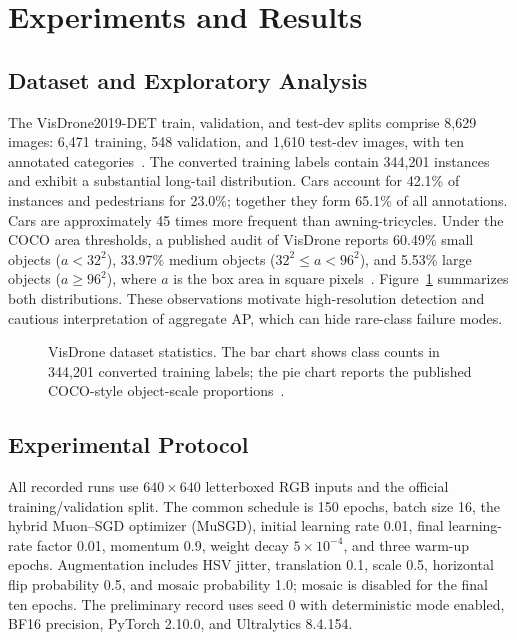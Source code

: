 \documentclass[conference]{IEEEtran}
\begin{document}
\section{Experiments and Results}
\subsection{Dataset and Exploratory Analysis}
The VisDrone2019-DET train, validation, and test-dev splits comprise 8,629
images: 6,471 training, 548 validation, and 1,610 test-dev images, with ten
annotated categories~\cite{du2019visdrone}.
The converted training labels contain 344,201 instances and exhibit a
substantial long-tail distribution.  Cars
account for 42.1\% of instances and pedestrians for 23.0\%; together they form
65.1\% of all annotations.  Cars are approximately 45 times more frequent
than awning-tricycles.  Under the COCO area
thresholds, a published audit of VisDrone reports 60.49\% small objects
($a<32^2$), 33.97\% medium objects ($32^2\leq a<96^2$), and 5.53\% large
objects ($a\geq96^2$), where $a$ is the box area in square
pixels~\cite{zhou2025smayolo}.
Figure~\ref{fig:dataset_distribution} summarizes both distributions.  These
observations motivate high-resolution detection and cautious interpretation
of aggregate AP, which can hide rare-class failure modes.

\begin{figure}[t]
\centering

\caption{VisDrone dataset statistics.  The bar chart shows class counts in
344,201 converted training labels; the pie chart reports the published
COCO-style object-scale proportions~\cite{zhou2025smayolo}.}
\label{fig:dataset_distribution}
\end{figure}

\subsection{Experimental Protocol}
All recorded runs use $640\times640$ letterboxed RGB inputs and the official
training/validation split.  The common schedule is 150 epochs, batch size 16,
the hybrid Muon--SGD optimizer (MuSGD), initial learning rate 0.01, final
learning-rate factor 0.01, momentum 0.9, weight decay $5\times10^{-4}$, and
three warm-up epochs.
Augmentation includes HSV jitter, translation 0.1, scale 0.5, horizontal flip
probability 0.5, and mosaic probability 1.0; mosaic is disabled for the final
ten epochs.  The preliminary record uses seed 0 with deterministic mode enabled,
BF16 precision, PyTorch 2.10.0, and Ultralytics 8.4.154.
\end{document}

